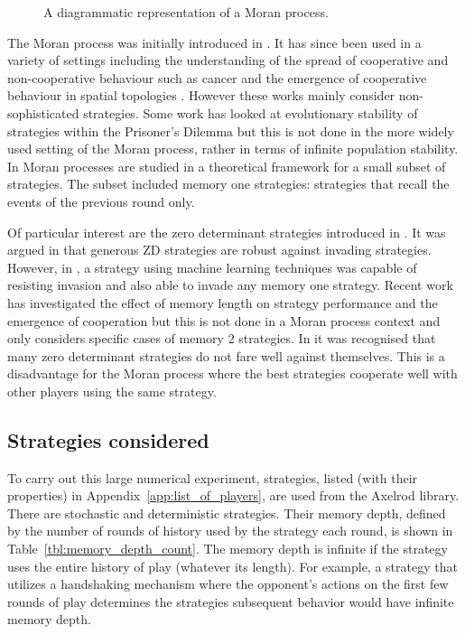 \documentclass{article}
\begin{document}
\begin{figure}[!hbtp]
    \centering
    
    \caption{A diagrammatic representation of a Moran process.}
    \label{fig:moran_process}
\end{figure}

The Moran process was initially introduced in \cite{Moran1957}. It has since
been used in a variety of settings including the understanding of the spread of
cooperative and non-cooperative behaviour such as cancer \cite{West2016} and the
emergence of cooperative behaviour in spatial topologies \cite{Nowak2017}.
However these works mainly consider non-sophisticated strategies. Some work has
looked at evolutionary stability of strategies within the Prisoner's Dilemma
\cite{Li2014} but this is not done in the more widely used setting of the Moran
process, rather in terms of infinite population stability. In \cite{Baek2016}
Moran processes are studied in a theoretical framework for a small subset of
strategies. The subset included memory one strategies: strategies that recall
the events of the previous round only.

Of particular interest are the zero determinant strategies introduced in
\cite{Press2012}. It was argued in \cite{stewart2013extortion} that generous
ZD strategies are robust against invading strategies. However, in \cite{Lee2015},
a strategy using machine learning techniques was capable of resisting invasion
and also able to invade any memory one strategy. Recent work \cite{Hilbe2017}
has investigated the effect of memory length on strategy performance and the
emergence of cooperation but this is not done in a Moran process context and only
considers specific cases of memory 2 strategies. In \cite{Adami2013} it was
recognised that many zero determinant strategies do not fare well against
themselves. This is a disadvantage for the Moran process where the best
strategies cooperate well with other players using the same strategy.

\subsection{Strategies considered}\label{sec:strategies}

To carry out this large numerical experiment, 
strategies, listed (with their properties) in Appendix~\ref{app:list_of_players},
are used from the Axelrod library. There are
stochastic and
deterministic strategies. Their memory depth,
defined by the number of rounds of history used by the strategy each round, is
shown in Table~\ref{tbl:memory_depth_count}. The memory depth is infinite if the
strategy uses the entire history of play (whatever its length). For example, a
strategy that utilizes a handshaking mechanism where the opponent's actions on
the first few rounds of play determines the strategies subsequent behavior would
have infinite memory depth.
\end{document}
